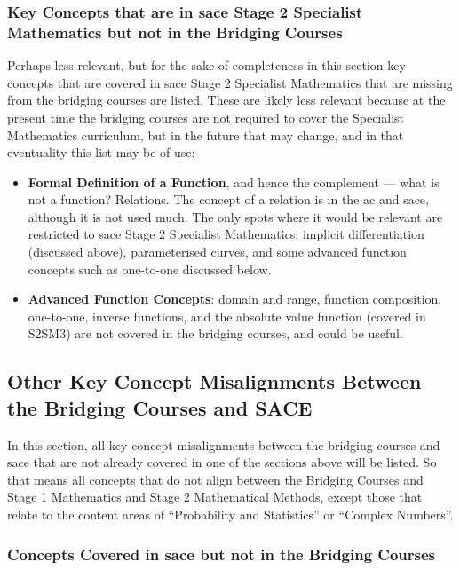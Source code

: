 \documentclass[twoside,12pt,a4paper]{report}
\begin{document}
\subsubsection{Key Concepts that are in \gls{sace} Stage 2 Specialist Mathematics but not in the Bridging Courses}

Perhaps less relevant, but for the sake of completeness in this section key concepts that are covered in \gls{sace} Stage 2 Specialist Mathematics that are missing from the bridging courses are listed. These are likely less relevant because at the present time the bridging courses are not required to cover the Specialist Mathematics curriculum, but in the future that may change, and in that eventuality this list may be of use:

\begin{itemize}
	\item \textbf{Formal Definition of a Function}, and hence the complement --- what is not a function? Relations. The concept of a relation is in the \gls{ac} and \gls{sace}, although it is not used much. The only spots where it would be relevant are restricted to \gls{sace} Stage 2 Specialist Mathematics: implicit differentiation (discussed above), parameterised curves, and some advanced function concepts such as one-to-one discussed below. 
	\item \textbf{Advanced Function Concepts}: domain and range, function composition, one-to-one, inverse functions, and the absolute value function (covered in S2SM3) are not covered in the bridging courses, and could be useful.
\end{itemize}


\subsection{Other Key Concept Misalignments Between the Bridging Courses and SACE}

In this section, all key concept misalignments between the bridging courses and \gls{sace} that are not already covered in one of the sections above will be listed. So that means all concepts that do not align between the Bridging Courses and Stage 1 Mathematics and Stage 2 Mathematical Methods, except those that relate to the content areas of ``Probability and Statistics'' or ``Complex Numbers''. 

\subsubsection{Concepts Covered in \gls{sace} but not in the Bridging Courses}
\end{document}
